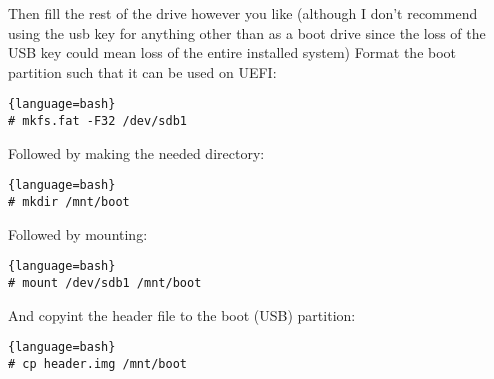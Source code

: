 Then fill the rest of the drive however you like (although I don't recommend using the usb key for anything other than as a boot drive since the loss of the USB key could mean loss of the entire installed system)
Format the boot partition such that it can be used on UEFI:
\begin{lstlisting}{language=bash}
# mkfs.fat -F32 /dev/sdb1
\end{lstlisting}
Followed by making the needed directory:
\begin{lstlisting}{language=bash}
# mkdir /mnt/boot
\end{lstlisting}
Followed by mounting:
\begin{lstlisting}{language=bash}
# mount /dev/sdb1 /mnt/boot
\end{lstlisting}
And copyint the header file to the boot (USB) partition:
\begin{lstlisting}{language=bash}
# cp header.img /mnt/boot
\end{lstlisting}
